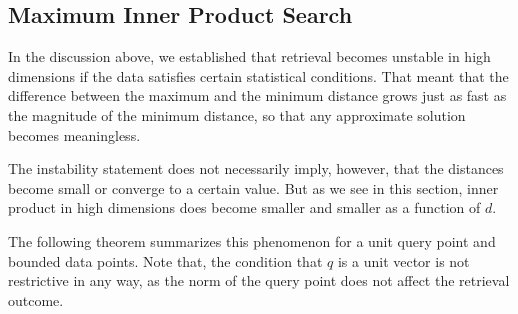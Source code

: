 \subsection{Maximum Inner Product Search}

In the discussion above, we established that retrieval becomes unstable in
high dimensions if the data satisfies certain statistical conditions.
That meant that the difference between the maximum and the minimum distance
grows just as fast as the magnitude of the minimum distance, so that any approximate
solution becomes meaningless.

\begin{svgraybox}
The instability statement does not necessarily imply, however, that the distances
become small or converge to a certain value. But as we see in this section,
inner product in high dimensions does become smaller and smaller as a function of $d$.
\end{svgraybox}

The following theorem summarizes this phenomenon for a unit query point and bounded
data points.
Note that, the condition that $q$ is a unit vector is not restrictive in any way,
as the norm of the query point does not affect the retrieval outcome.

